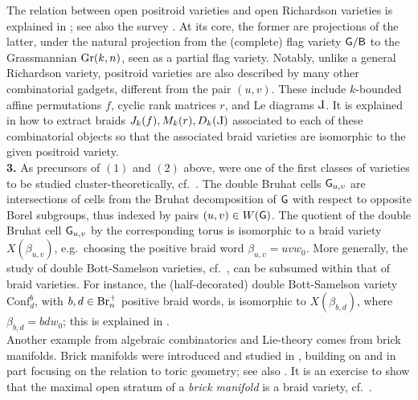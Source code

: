         The relation between open positroid varieties and open Richardson varieties is explained in \cite{KLS,KLS2}; see also the survey \cite{speyer2024richardsonvarietiesprojectedrichardson}. At its core, the former are projections of the latter, under the natural projection from the (complete) flag variety $\mathsf{G}/\mathsf{B}$ to the Grassmannian $\operatorname{Gr}(k,n)$, seen as a partial flag variety. Notably, unlike a general Richardson variety, positroid varieties are also described by many other combinatorial gadgets, different from the pair $(u,v)$. These include $k$-bounded affine permutations $f$, cyclic rank matrices $r$, and Le diagrams $\Le$. It is explained in \cite{CGGS2} how to extract braids $J_k(f),M_k(r),D_{k}(\Le)$ associated to each of these combinatorial objects so that the associated braid varieties are isomorphic to the given positroid variety.\\

{\bf 3.} As precursors of $(1)$ and $(2)$ above, \color{blue}{\it double Bruhat cells} \color{black} were one of the first classes of varieties to be studied cluster-theoretically, cf.~\cite{FZ1999}. The double Bruhat cells $\mathsf{G}_{u,v}$ are intersections of cells from the Bruhat decomposition of $\mathsf{G}$ with respect to opposite Borel subgroups, thus indexed by pairs $(u,v)\in W(\mathsf{G})$. The quotient of the double Bruhat cell $\mathsf{G}_{u,v}$ by the corresponding torus is isomorphic to a braid variety $X(\beta_{u,v})$, e.g.~choosing the positive braid word $\beta_{u,v}=uvw_0$. More generally, the study of double Bott-Samelson varieties, cf.~\cite{ShenWeng2021DoubleBottSamelson}, can be subsumed within that of braid varieties. For instance, the (half-decorated) double Bott-Samelson variety $\mbox{Conf}^b_d$, with $b,d\in \text{Br}^+_n$ positive braid words, is isomorphic to $X(\beta_{b,d})$, where $\beta_{b,d}=bdw_0$; this is explained in \cite[Section 3.7]{CGGLSS25}.\\

\noindent Another example from algebraic combinatorics and Lie-theory comes from brick manifolds. Brick manifolds were introduced and studied in \cite{Escobar}, building on \cite{MR2864447,MR3327085} and in part focusing on the relation to toric geometry; see also \cite[Section 3.4]{speyer2024richardsonvarietiesprojectedrichardson}. It is an exercise to show that the \color{blue} maximal open stratum of a {\it brick manifold} \color{black} is a braid variety, cf.~\cite[Theorem 1.4.(i)]{CGGS2}.\\

